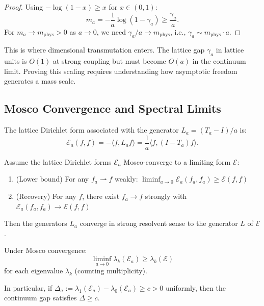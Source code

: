 \begin{proof}
Using $-\log(1-x) \geq x$ for $x \in (0,1)$:
\begin{equation}
    m_a = -\frac{1}{a} \log(1 - \gamma_a) \geq \frac{\gamma_a}{a}.
\end{equation}
For $m_a \to m_{\text{phys}} > 0$ as $a \to 0$, we need $\gamma_a / a \to m_{\text{phys}}$, i.e., $\gamma_a \sim m_{\text{phys}} \cdot a$.
\end{proof}

\begin{remark}
This is where dimensional transmutation enters. The lattice gap $\gamma_a$ in lattice units is $O(1)$ at strong coupling but must become $O(a)$ in the continuum limit. Proving this scaling requires understanding how asymptotic freedom generates a mass scale.
\end{remark}

\subsection{Mosco Convergence and Spectral Limits}

\begin{definition}\label{def:dirichlet-form-app211}
The lattice Dirichlet form associated with the generator $L_a = (T_a - I)/a$ is:
\begin{equation}
    \mathcal{E}_a(f, f) = -\langle f, L_a f \rangle = \frac{1}{a} \langle f, (I - T_a) f \rangle.
\end{equation}
\end{definition}

\begin{theorem}\label{thm:mosco-convergence}
Assume the lattice Dirichlet forms $\mathcal{E}_a$ Mosco-converge to a limiting form $\mathcal{E}$:
\begin{enumerate}
    \item (Lower bound) For any $f_a \rightharpoonup f$ weakly: $\liminf_{a \to 0} \mathcal{E}_a(f_a, f_a) \geq \mathcal{E}(f, f)$
    \item (Recovery) For any $f$, there exist $f_a \to f$ strongly with $\mathcal{E}_a(f_a, f_a) \to \mathcal{E}(f, f)$
\end{enumerate}
Then the generators $L_a$ converge in strong resolvent sense to the generator $L$ of $\mathcal{E}$.
\end{theorem}

\begin{theorem}\label{thm:spectral-lsc}
Under Mosco convergence:
\begin{equation}
    \liminf_{a \to 0} \lambda_k(\mathcal{E}_a) \geq \lambda_k(\mathcal{E})
\end{equation}
for each eigenvalue $\lambda_k$ (counting multiplicity).

In particular, if $\Delta_a := \lambda_1(\mathcal{E}_a) - \lambda_0(\mathcal{E}_a) \geq c > 0$ uniformly, then the continuum gap satisfies $\Delta \geq c$.
\end{theorem}

